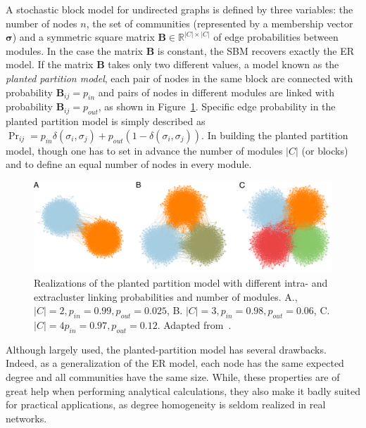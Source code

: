 A stochastic block model for undirected graphs is defined by three variables: the number of nodes $n$, the set of communities (represented by a membership vector $\boldsymbol \sigma$) and a symmetric square matrix  $\mathbf{B} \in \mathbb{R}^{|C| \times |C|}$ of edge probabilities between modules.
In the case the matrix $\mathbf{B}$ is constant, the SBM recovers exactly the ER model.
If the matrix $\mathbf{B}$ takes only two different values, a model known as the \emph{planted partition model}, each pair of nodes in the same block are connected with probability $\mathbf{B}_{ij}=p_{in}$ and pairs of nodes in different modules are linked with probability $\mathbf{B}_{ij}=p_{out}$, as shown in Figure~\ref{fig:planted_peixoto}.
Specific edge probability in the planted partition model is simply described as $\Pr_{ij} = p_{in}\delta(\sigma_i,\sigma_j) + p_{out}(1-\delta(\sigma_i,\sigma_j))$.
In building the planted partition model, though one has to set in advance the number of modules $|C|$ (or blocks) and to define an equal number of nodes in every module.

\begin{figure}[htb!]
\centering
\includegraphics[width=1.0\textwidth]{images/peixoto_block_models.pdf}
\caption{Realizations of the planted partition model with different intra- and extracluster linking probabilities and number of modules.
A., $|C|=2, p_{in}=0.99, p_{out}=0.025$, B.
$|C|=3, p_{in}=0.98, p_{out}=0.06$, C.
$|C|=4 p_{in}=0.97, p_{out}=0.12$.
Adapted from~\cite{peixoto2015}.}
\label{fig:planted_peixoto}
\end{figure}

Although largely used, the planted-partition model has several drawbacks.
Indeed, as a generalization of the ER model, each node has the same expected degree and all communities have the same size.
While, these properties are of great help when performing analytical calculations, they also make it badly suited for practical applications, as degree homogeneity is seldom realized in real networks.

